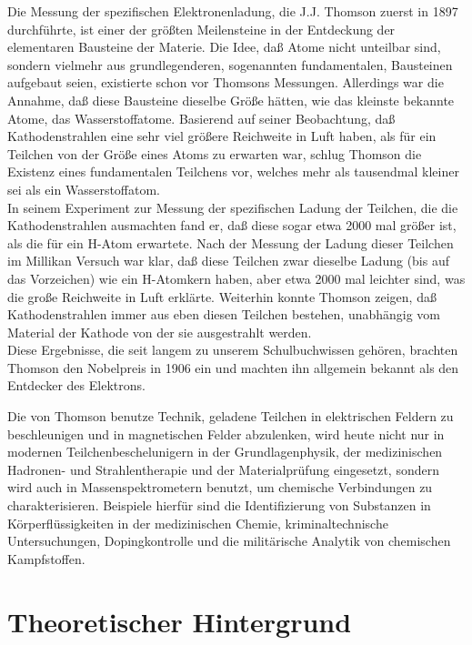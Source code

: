 Die Messung der spezifischen Elektronenladung, die J.J. Thomson zuerst in 1897 durchführte, ist einer der größten Meilensteine in der Entdeckung der elementaren Bausteine der Materie. Die Idee, daß Atome nicht unteilbar sind, sondern vielmehr aus grundlegenderen, sogenannten fundamentalen, Bausteinen aufgebaut seien, existierte schon vor Thomsons Messungen. Allerdings war die Annahme, daß diese Bausteine dieselbe Größe hätten, wie das kleinste bekannte Atome, das Wasserstoffatome. Basierend auf seiner Beobachtung, daß Kathodenstrahlen eine sehr viel größere Reichweite in Luft haben, als für ein Teilchen von der Größe eines Atoms zu erwarten war, schlug Thomson die Existenz eines fundamentalen Teilchens vor, welches mehr als tausendmal kleiner sei als ein Wasserstoffatom.\\
In seinem Experiment zur Messung der spezifischen Ladung der Teilchen, die die Kathodenstrahlen ausmachten fand er, daß diese sogar etwa 2000 mal größer ist, als die für ein H-Atom erwartete. Nach der Messung der Ladung dieser Teilchen im Millikan Versuch war klar, daß diese Teilchen zwar dieselbe Ladung (bis auf das Vorzeichen) wie ein H-Atomkern haben, aber etwa 2000 mal leichter sind, was die große Reichweite in Luft erklärte. Weiterhin konnte Thomson zeigen, daß Kathodenstrahlen immer aus eben diesen Teilchen bestehen, unabhängig vom Material der Kathode von der sie ausgestrahlt werden.\\
Diese Ergebnisse, die seit langem zu unserem Schulbuchwissen gehören, brachten Thomson den Nobelpreis in 1906 ein und machten ihn allgemein bekannt als den Entdecker des Elektrons.

\noindent
Die von Thomson benutze Technik, geladene Teilchen in elektrischen Feldern zu beschleunigen und in magnetischen Felder abzulenken, wird heute nicht nur in modernen Teilchenbeschelunigern in der Grundlagenphysik, der medizinischen Hadronen- und Strahlentherapie und der Materialprüfung eingesetzt, sondern wird auch in Massenspektrometern benutzt, um chemische Verbindungen zu charakterisieren. Beispiele hierfür sind die Identifizierung von Substanzen in Körperflüssigkeiten in der medizinischen Chemie, kriminaltechnische Untersuchungen, Dopingkontrolle und die militärische Analytik von chemischen Kampfstoffen.

\section{Theoretischer Hintergrund}

